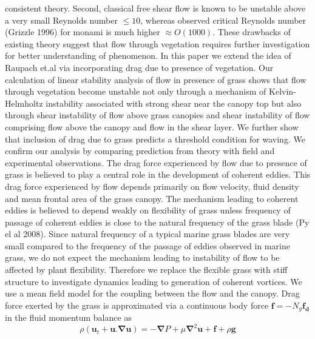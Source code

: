 \documentclass[aps,prl,twocolumn,showpacs,superscriptaddress,groupedaddress,10pt]{revtex4-1}  %
\newcommand{\bu}{\mathbf{u}}
\newcommand{\grad}{\mathbf{\nabla}}
\begin{document}
consistent theory. Second, classical free shear flow is known to be unstable above a very small Reynolds number $\leq 10 $, whereas observed critical 
Reynolds number\cite{Grizzle96} (Grizzle 1996) for monami is much higher $\approx O(1000)$. These drawbacks of existing theory suggest that flow through vegetation requires 
further investigation for better understanding of phenomenon.
\newline 
In this paper we extend the idea of Raupach et.al\cite{Raupach96} via incorporating drag due to presence of vegetation. Our calculation of linear stability analysis of flow in presence of grass
shows that flow through vegetation become unstable not only through a mechanism of Kelvin-Helmholtz 
instability associated with strong shear near the canopy top but also through shear instability of flow above grass canopies and shear instability of flow comprising flow above the canopy 
and flow in the shear layer. We further show that inclusion of drag due to grass predicts a threshold condition for waving. We confirm our analysis by comparing prediction from theory 
with field and experimental observations.
\newline  
The drag force experienced by flow due to presence of grass is believed to play a central role in the development of coherent eddies. This drag force experienced by flow depends 
primarily on flow velocity, fluid density and mean frontal area of the grass canopy. The mechanism leading to coherent eddies is believed to depend weakly on flexibility of grass
unless frequency of passage of coherent eddies is close to the natural frequency of the grass blade (Py el al 2008). Since natural frequency of a typical marine grass blades are
very small compared to the frequency of the passage of eddies observed in marine grass, we do not expect the mechanism leading to instability of flow to be affected by plant flexibility.
Therefore we replace the flexible grass with stiff structure to investigate dynamics leading to generation of coherent vortices. We use a mean field model for the coupling between the 
flow and the canopy. Drag force exerted by the grass is approximated via a 
continuous body force $\mathbf{f}=-N_g\mathbf{f_d}$ in the fluid momentum balance as
\begin{equation}
\rho \left(\bu_{t}+\bu.\grad\bu \right) = -\grad P+\mu\grad^{2}\bu +\mathbf{f}+\rho\mathbf{g}
\label{navier-stokes}
\end{equation}
\end{document}
